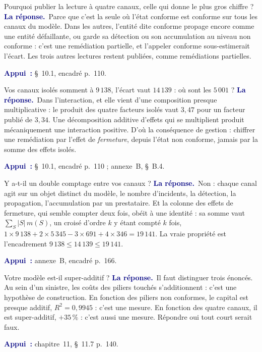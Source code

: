 \documentclass[11pt,a4paper]{article}
\newcommand{\rep}[1]{\smallskip\noindent\textcolor{navy}{\textbf{La réponse.}}\ #1\par}
\newcommand{\appui}[1]{\smallskip\noindent\small\textcolor{navy}{\textbf{Appui~:}} #1\par\normalsize}
\begin{document}
\begin{question}{\og Pourquoi publier la lecture à quatre canaux, celle qui donne le plus gros chiffre ?\fg{}}
\rep{Parce que c'est la seule où l'état conforme est conforme sur tous les canaux du modèle. Dans
les autres, l'entité dite conforme propage encore comme une entité défaillante, ou garde sa
détection ou son accumulation au niveau non conforme : c'est une remédiation partielle, et
l'appeler conforme sous-estimerait l'écart. Les trois autres lectures restent publiées, comme
remédiations partielles.}
\appui{\S~10.1, encadré p.~110.}
\end{question}

\begin{question}{\og Vos canaux isolés somment à $9\,138$, l'écart vaut $14\,139$ : où sont les $5\,001$ ?\fg{}}
\rep{Dans l'interaction, et elle vient d'une composition presque multiplicative : le produit des
quatre facteurs isolés vaut $3{,}47$ pour un facteur publié de $3{,}34$. Une décomposition
additive d'effets qui se multiplient produit mécaniquement une interaction positive. D'où la
conséquence de gestion : chiffrer une remédiation par l'effet de \emph{fermeture}, depuis l'état
non conforme, jamais par la somme des effets isolés.}
\appui{\S~10.1, encadré p.~110 ; annexe~B, \S~B.4.}
\end{question}

\begin{question}{\og Y a-t-il un double comptage entre vos canaux ?\fg{}}
\rep{Non : chaque canal agit sur un objet distinct du modèle, le nombre d'incidents, la détection,
la propagation, l'accumulation par un prestataire. Et la colonne des effets de fermeture, qui
semble compter deux fois, obéit à une identité : sa somme vaut $\sum_S|S|\,m(S)$, un croisé d'ordre
$k$ y étant compté $k$ fois, $1\times9\,138+2\times5\,345-3\times691+4\times346=19\,141$. La vraie
propriété est l'encadrement $9\,138\le14\,139\le19\,141$.}
\appui{annexe~B, encadré p.~166.}
\end{question}

\begin{question}{\og Votre modèle est-il super-additif ?\fg{}}
\rep{Il faut distinguer trois énoncés. Au sein d'un sinistre, les coûts des piliers touchés
s'additionnent : c'est une hypothèse de construction. En fonction des piliers non conformes, le
capital est presque additif, $R^2=0{,}9945$ : c'est une mesure. En fonction des quatre canaux, il
est super-additif, $+35\,\%$ : c'est aussi une mesure. Répondre \og oui\fg{} tout court serait faux.}
\appui{chapitre~11, \S~11.7 p.~140.}
\end{question}
\end{document}

